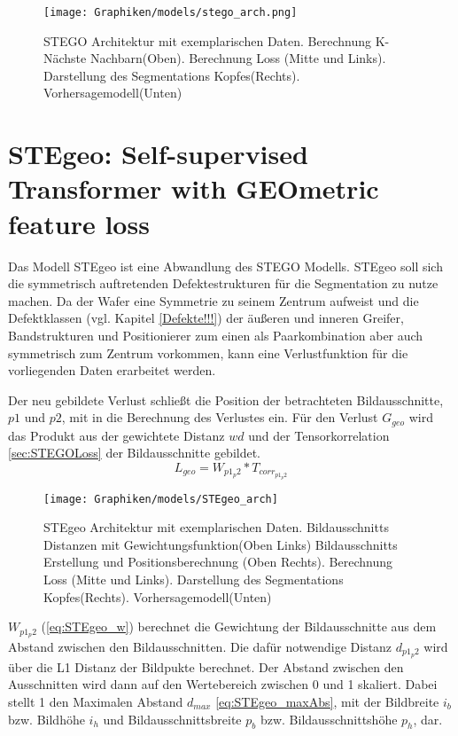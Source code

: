 		
		\begin{figure}[ht]
			\centering
			\texttt{[image: Graphiken/models/stego\_arch.png]}
			\caption{STEGO Architektur mit exemplarischen Daten. Berechnung K-Nächste Nachbarn(Oben). Berechnung Loss (Mitte und Links). Darstellung des Segmentations Kopfes(Rechts). Vorhersagemodell(Unten) }
			\label{fig:stego_arch}
		\end{figure}
		
		  
	\section{STEgeo: Self-supervised Transformer with GEOmetric feature loss}
	\label{ansatz:STEgeo}
		
		
		Das Modell STEgeo ist eine Abwandlung des STEGO \cite{STEGOhamilton2022unsupervised} Modells. STEgeo soll sich die symmetrisch auftretenden Defektestrukturen für die Segmentation zu nutze machen. Da der Wafer eine Symmetrie zu seinem Zentrum aufweist und die Defektklassen (vgl. Kapitel \ref{Defekte!!!}) der äußeren und inneren Greifer, Bandstrukturen und Positionierer zum einen als Paarkombination aber auch symmetrisch zum Zentrum vorkommen, kann eine Verlustfunktion für die vorliegenden Daten erarbeitet werden.
		
		Der neu gebildete Verlust schließt die Position der betrachteten Bildausschnitte, $p1$ und $p2$, mit in die Berechnung des Verlustes ein. Für den Verlust $G_{geo}$ wird das Produkt aus der gewichtete Distanz $ wd$ und der Tensorkorrelation \ref{sec:STEGOLoss} der Bildausschnitte gebildet.
		\begin{equation}
			L_{geo} = W_{p1_p2} * T_{corr_{p1_p2}}
			\label{eq:STEgeo}	
		\end{equation}
		
		
	
		\begin{figure}[ht]
			\centering
			\texttt{[image: Graphiken/models/STEgeo\_arch]}
			\caption{STEgeo Architektur mit exemplarischen Daten. Bildausschnitts Distanzen mit Gewichtungsfunktion(Oben Links) Bildausschnitts Erstellung und Positionsberechnung (Oben Rechts). Berechnung Loss (Mitte und Links). Darstellung des Segmentations Kopfes(Rechts). Vorhersagemodell(Unten) }
			\label{fig:stego_arch}
		\end{figure}
	
		$W_{p1_p2}$ (\ref{eq:STEgeo_w}) berechnet die Gewichtung der Bildausschnitte aus dem Abstand zwischen den Bildausschnitten. Die dafür notwendige Distanz $d_{p1_p2}$ wird über die L1 Distanz der Bildpukte berechnet. Der Abstand zwischen den Ausschnitten wird dann auf den Wertebereich zwischen 0 und 1 skaliert. Dabei stellt 1 den Maximalen Abstand $d_{max}$ \ref{eq:STEgeo_maxAbs}, mit der Bildbreite $i_b$ bzw. Bildhöhe $i_h$ und Bildausschnittsbreite $p_b$ bzw. Bildausschnittshöhe $p_h$, dar.\\
		
